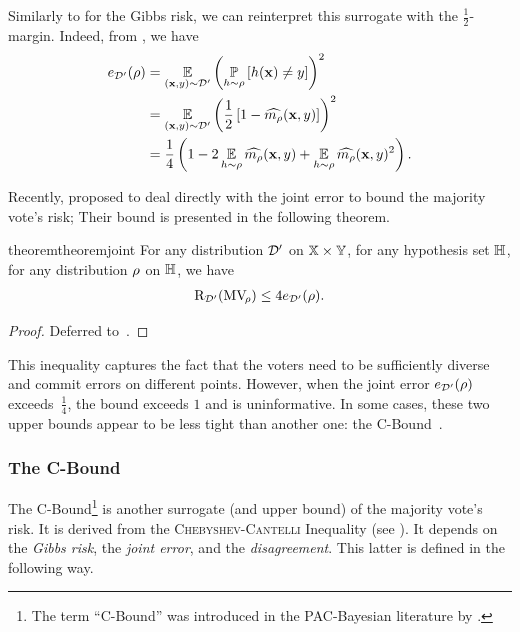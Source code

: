 Similarly to  for the Gibbs risk, we can reinterpret this surrogate with the $\frac{1}{2}$-margin.
Indeed, from \citet{GermainLacasseLavioletteMarchandRoy2015}, we have 
\begin{align}
    e_{\mathcal{D}'}(\rho) &= \operatorname*{\mathbb{E}}_{(\mathbf{x},y)\sim\mathcal{D}'}\left( \operatorname*{\mathbb{P}}_{h\sim\rho}\left[ h(\mathbf{x})\ne y\right]\right)^2\nonumber\\
    &= \operatorname*{\mathbb{E}}_{(\mathbf{x},y)\sim\mathcal{D}'}\left(\frac{1}{2}\left[1-\widehat{m_{\rho}}(\mathbf{x},y)\right]\right)^2\nonumber\\
    &= \frac{1}{4}\left( 1-2\operatorname*{\mathbb{E}}_{h\sim\rho}\widehat{m_{\rho}}(\mathbf{x},y) + \operatorname*{\mathbb{E}}_{h\sim\rho}\widehat{m_{\rho}}(\mathbf{x},y)^2\right).\label{chap:pac-bayes:eq:joint-margin} 
\end{align}

Recently, \citet{MasegosaLorenzenIgelSeldin2020} proposed to deal directly with the joint error to bound the majority vote's risk; Their bound is presented in the following theorem.

\begin{restatable}{theorem}{theoremjoint}\label{chap:pac-bayes:theorem:4joint}
For any distribution $\mathcal{D}'$ on $\mathbb{X}\times\mathbb{Y}$, for any hypothesis set $\mathbb{H}$, for any distribution $\rho$ on $\mathbb{H}$, we have
\begin{align}
    \text{R}_{\mathcal{D}'}(\text{MV}_{\!\rho}) \le 4e_{\mathcal{D}'}(\rho). 
    \label{chap:pac-bayes:eq:4joint}
\end{align}
\end{restatable}
\begin{noaddcontents}\begin{proof}
Deferred to~.
\end{proof}\end{noaddcontents}

This inequality captures the fact that the voters need to be sufficiently diverse and commit errors on different points.
However, when the joint error $e_{\mathcal{D}'}(\rho)$ exceeds~$\frac14$, the bound exceeds $1$ and is uninformative.
In some cases, these two upper bounds appear to be less tight than another one: the C-Bound~\citep{Breiman2001,LacasseLavioletteMarchandGermainUsunier2006}. 

\subsubsection{The C-Bound}

The C-Bound\footnote{The term ``C-Bound'' was introduced in the PAC-Bayesian literature by \citep{LacasseLavioletteMarchandGermainUsunier2006}.} \citep{Breiman2001,LacasseLavioletteMarchandGermainUsunier2006} is another surrogate (and upper bound) of the majority vote's risk.
It is derived from the \textsc{Chebyshev}-\textsc{Cantelli} Inequality (see ).
It depends on the {\it Gibbs risk}, the {\it joint error}, and the {\it disagreement}.
This latter is defined in the following way.

